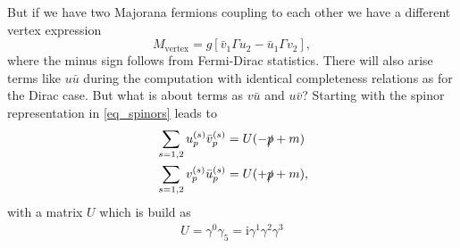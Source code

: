 \documentclass[11pt,a4paper,twoside]{article}
\begin{document}
But if we have two Majorana fermions coupling to each other we have a different vertex expression
\begin{equation}
 M_\text{vertex} = g\left[\bar v_1 \Gamma u_2 - \bar u_1 \Gamma v_2\right],
\end{equation}
where the minus sign follows from Fermi-Dirac statistics. There will also arise terms like $u\bar u$ during the computation with identical completeness
relations as for the Dirac case. But what is about terms as $v\bar u$ and $u\bar v$? Starting with the spinor representation in \eqref{eq_spinors} leads
to 
\begin{align}
 &\sum_{s=1,2} u_p^{(s)} \bar v_p^{(s)} = U(-\slashed{p} + m) \\
 &\sum_{s=1,2} v_p^{(s)} \bar u_p^{(s)} = U(+\slashed{p} + m), 
\end{align}
with a matrix $U$ which is build as
\begin{align}
 U = \gamma^0 \gamma_5 = \text{i} \gamma^1 \gamma^2 \gamma^3
\end{align}
\end{document}

